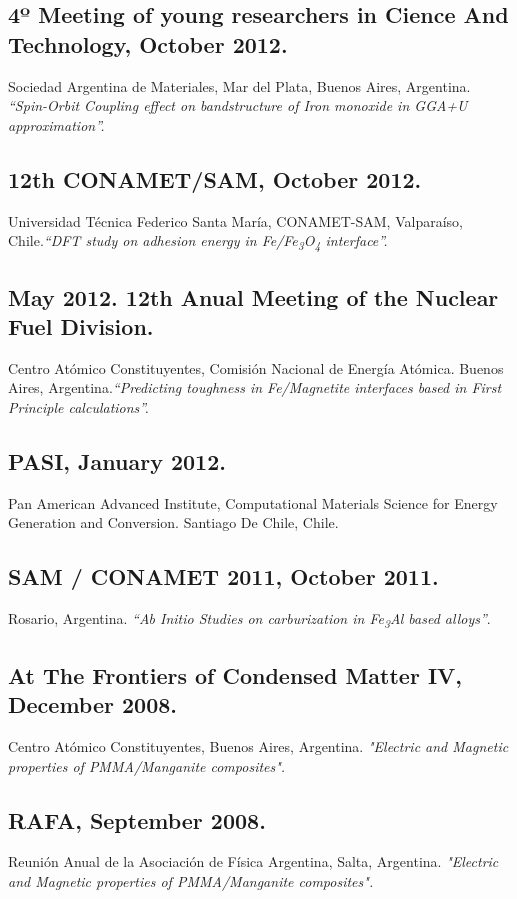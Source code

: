 \subsection{4º Meeting of young researchers in Cience And Technology, October
2012.}Sociedad Argentina de Materiales, Mar del Plata, Buenos Aires, Argentina.
\emph{  “Spin-Orbit Coupling effect on bandstructure of Iron monoxide in GGA+U
approximation”. }

\subsection{12th CONAMET/SAM, October 2012.}  Universidad Técnica Federico Santa
María, CONAMET-SAM, Valparaíso, Chile.\emph{“DFT study on adhesion energy in
Fe/Fe\textsubscript{3}O\textsubscript{4} interface”.}

\subsection{May 2012. 12th Anual Meeting of the Nuclear Fuel Division.} Centro
Atómico Constituyentes, Comisión Nacional de Energía Atómica. Buenos Aires,
Argentina.\emph{“Predicting toughness in Fe/Magnetite interfaces based in First
Principle calculations”.}

\subsection{PASI, January 2012.} Pan American Advanced Institute, Computational
Materials Science for Energy Generation and Conversion. Santiago De Chile,
Chile. %

\subsection{SAM / CONAMET 2011, October 2011.}  Rosario, Argentina. \emph{“Ab
Initio Studies on carburization in Fe\textsubscript{3}Al based alloys”}.

\subsection{At The Frontiers of Condensed Matter IV, December 2008.} Centro
Atómico Constituyentes, Buenos Aires, Argentina. \emph{"Electric and Magnetic
properties of PMMA/Manganite composites". }

\subsection{RAFA, September 2008.} Reunión Anual de la Asociación de Física
Argentina, Salta, Argentina. \emph{"Electric and Magnetic properties of
PMMA/Manganite composites". }

